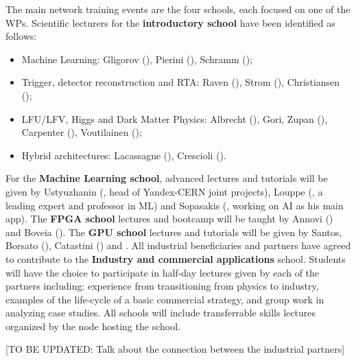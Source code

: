 The main network training events are the four schools,
each focused on one of the WPs. 
Scientific lecturers for the \textbf{introductory school} have been identified as follows:
\begin{itemize}
\item Machine Learning: Gligorov (\cnrsentity), Pierini (\cernentity), Schramm (\unigeentity);
\item Trigger, detector reconstruction and RTA: Raven (\nikhefentity), Strom (\ohioentity), Christiansen (\lundentity);
\item LFU/LFV, Higgs and Dark Matter Physics: Albrecht (\dortmundentity), Gori, Zupan (\cincinnatientity), Carpenter (\ohioentity), Voutilainen (\helsinkientity);
\item Hybrid architectures: Lacassagne (\sorbonneentity), Crescioli (\cnrsentity). 
\end{itemize}
For the \textbf{Machine Learning school}, advanced lectures and tutorials will be given by Ustyuzhanin (\yandex, head of Yandex-CERN joint projects), 
Louppe (\liegesentity, a leading expert and professor in ML) and Sopasakis (\ximantisentity, working on AI as his main app). 
The \textbf{FPGA school} lectures and bootcamp will be taught by Annovi (\pisaentity) and Boveia (\cernentity). 
The \textbf{GPU school} lectures and tutorials will be given by Santos, Borsato (\santiagoentity), Catastini (\lightboxentity) and . 
All industrial beneficiaries and partners have agreed to contribute to the \textbf{Industry and commercial applications} school.
Students will have the choice to participate in half-day lectures given by each of the partners including: experience from transitioning from physics to industry, examples of the life-cycle of a basic commercial strategy, and group work in analyzing case studies. 
All schools will include transferrable skills lectures organized by the node hosting the school. 

[TO BE UPDATED: Talk about the connection between the industrial partners]

